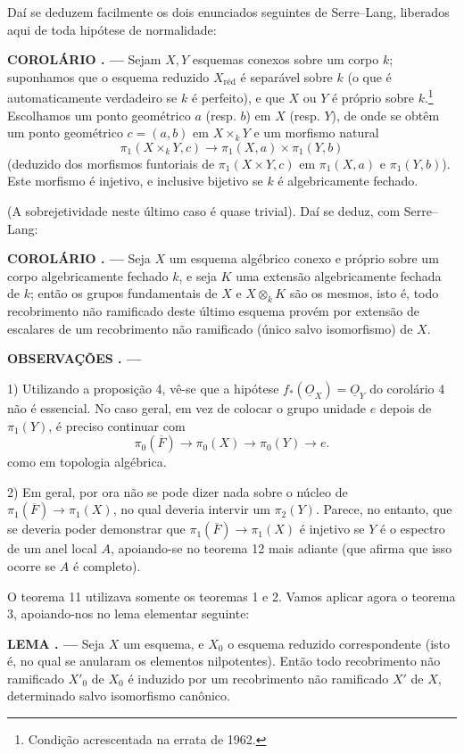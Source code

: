 \documentclass[11pt,twoside,openany]{book}
\numberwithin{equation}{section}
\newcommand{\src}[1]{%
  \phantomsection\hypertarget{src:#1}{}%
  \marginpar{\raggedleft\footnotesize\sffamily #1}%
}
\newcommand{\Osh}{\underline{O}}
\theoremstyle{plain}
\theoremstyle{definition}
\theoremstyle{remark}
\newcommand{\result}[2]{%
  \par\medskip\noindent\textbf{#1%
  \if\relax\detokenize{#2}\relax\else\space#2\fi. ---}\enspace
}
\newcommand{\FgaUnitKey}{frontmatter}
\renewcommand{\src}[1]{%
  \phantomsection\hypertarget{src:\FgaUnitKey:#1}{}%
  \marginpar{\raggedleft\footnotesize\sffamily #1}%
}
\begin{document}
Daí se deduzem facilmente os dois enunciados seguintes de Serre--Lang,
liberados aqui de toda hipótese de normalidade:

\result{COROLÁRIO}{5} Sejam $X,Y$ esquemas conexos sobre um corpo $k$;
suponhamos que o esquema reduzido $X_{\mathrm{réd}}$ é separável sobre $k$
(o que é automaticamente verdadeiro se $k$ é perfeito), e que $X$ ou $Y$ é
próprio sobre $k$.\footnote{Condição acrescentada na errata de 1962.}
Escolhamos um ponto geométrico $a$ (resp. $b$) em $X$ (resp. $Y$), de onde se
obtêm um ponto geométrico $c=(a,b)$ em $X\times_kY$ e um morfismo natural
\[
  \pi_1(X\times_kY,c)\longrightarrow
  \pi_1(X,a)\times\pi_1(Y,b)
\]
(deduzido dos morfismos funtoriais de $\pi_1(X\times Y,c)$ em $\pi_1(X,a)$
e $\pi_1(Y,b)$). Este morfismo é injetivo, e inclusive bijetivo se $k$ é
algebricamente fechado.

(A sobrejetividade neste último caso é quase trivial). Daí se deduz,
com Serre--Lang:

\result{COROLÁRIO}{6} Seja $X$ um esquema algébrico conexo e próprio sobre um corpo
algebricamente fechado $k$, e seja $K$ uma extensão algebricamente fechada
de $k$; então os grupos fundamentais de $X$ e $X\otimes_kK$ são os
mesmos, isto é, todo recobrimento não ramificado deste último esquema
provém por extensão de escalares de um recobrimento não ramificado (único
salvo isomorfismo) de $X$.

\result{OBSERVAÇÕES}{}

1) Utilizando a proposição 4, vê-se que a hipótese
$f_*(\Osh_X)=\Osh_Y$ do corolário 4 não é essencial. No caso geral, em vez
de colocar o grupo unidade $e$ depois de $\pi_1(Y)$, é preciso continuar com
\[
  \pi_0(\overline F)\longrightarrow\pi_0(X)
  \longrightarrow\pi_0(Y)\longrightarrow e.
\]
como em topologia algébrica.

\src{216}
2) Em geral, por ora não se pode dizer nada sobre o núcleo de
$\pi_1(\overline F)\longrightarrow\pi_1(X)$, no qual deveria intervir um
$\pi_2(Y)$. Parece, no entanto, que se deveria poder demonstrar que
$\pi_1(\overline F)\longrightarrow\pi_1(X)$ é injetivo se $Y$ é o espectro
de um anel local $A$, apoiando-se no teorema 12 mais adiante (que afirma que
isso ocorre se $A$ é completo).

O teorema 11 utilizava somente os teoremas 1 e 2. Vamos aplicar agora o
teorema 3, apoiando-nos no lema elementar seguinte:

\result{LEMA}{6} Seja $X$ um esquema, e $X_0$ o esquema reduzido correspondente
(isto é, no qual se anularam os elementos nilpotentes). Então todo
recobrimento não ramificado $X'_0$ de $X_0$ é induzido por um recobrimento
não ramificado $X'$ de $X$, determinado salvo isomorfismo canônico.
\end{document}

